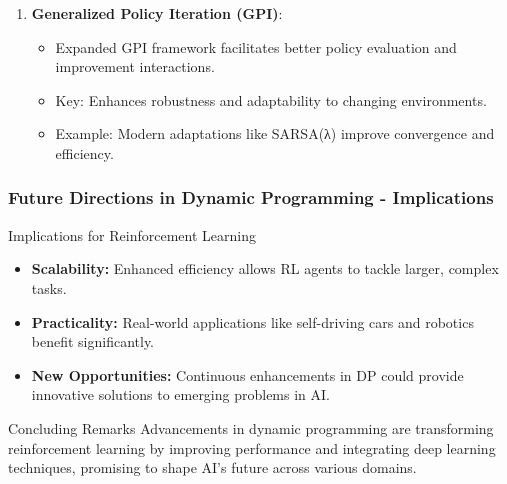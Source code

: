 \documentclass[aspectratio=169]{beamer}
\begin{document}
\begin{frame}[fragile]
\begin{enumerate}
        \item \textbf{Generalized Policy Iteration (GPI)}:
            \begin{itemize}
                \item Expanded GPI framework facilitates better policy evaluation and improvement interactions.
                \item Key: Enhances robustness and adaptability to changing environments.
                \item Example: Modern adaptations like SARSA(λ) improve convergence and efficiency.
            \end{itemize}
    \end{enumerate}
\end{frame}

\begin{frame}[fragile]
    \frametitle{Future Directions in Dynamic Programming - Implications}
    \begin{block}{Implications for Reinforcement Learning}
        \begin{itemize}
            \item \textbf{Scalability:} Enhanced efficiency allows RL agents to tackle larger, complex tasks.
            \item \textbf{Practicality:} Real-world applications like self-driving cars and robotics benefit significantly.
            \item \textbf{New Opportunities:} Continuous enhancements in DP could provide innovative solutions to emerging problems in AI.
        \end{itemize}
    \end{block}

    \begin{block}{Concluding Remarks}
        Advancements in dynamic programming are transforming reinforcement learning by improving performance and integrating deep learning techniques, promising to shape AI’s future across various domains.
    \end{block}
\end{frame}
\end{document}
